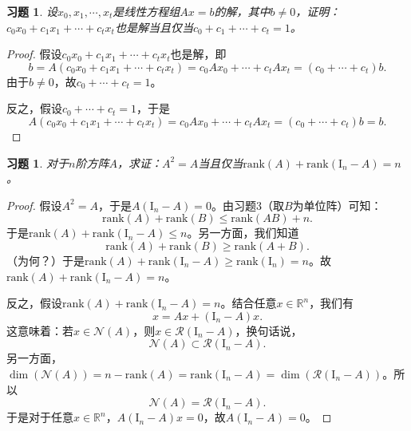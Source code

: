 \documentclass[UTF8]{ctexart}
\newtheorem{ex}[thm]{习题}
\begin{document}
\begin{ex}
	设$x_0, x_1, \cdots, x_t$是线性方程组$Ax =b$的解，其中$b \neq 0$，证明：$c_0 x_0 + c_1x_1 + \cdots + c_t x_t$也是解当且仅当$c_0 + c_1 + \cdots + c_t = 1$。
\end{ex}
\begin{proof}
	假设$c_0 x_0 + c_1x_1 + \cdots + c_t x_t$也是解，即
	\begin{equation}
		b = A(c_0 x_0 + c_1x_1 + \cdots + c_t x_t) = c_0 Ax_0+ \cdots + c_t Ax_t = (c_0+ \cdots + c_t)b.
	\end{equation}
	由于$b \neq 0$，故$c_0+ \cdots + c_t = 1$。
	\
	
	反之，假设$c_0+ \cdots + c_t = 1$，于是
	\begin{equation}
		A(c_0 x_0 + c_1x_1 + \cdots + c_t x_t) = c_0 Ax_0+ \cdots + c_t Ax_t = (c_0+ \cdots + c_t)b = b.
	\end{equation}
\end{proof}
\begin{ex}
	对于$n$阶方阵$A$，求证：$A^2 = A$当且仅当$\mathrm{rank}(A) + \mathrm{rank}(\mathrm{I}_n - A) = n $。
\end{ex}
\begin{proof}
	假设$A^2 = A$，于是$A(\mathrm{I}_n - A) =0$。由习题3（取$B$为单位阵）可知：
	\[
	\mathrm{rank}(A) + \mathrm{rank}(B) \leq \mathrm{rank}(AB) + n.  
	\]
	于是$\mathrm{rank}(A) + \mathrm{rank}(\mathrm{I}_n - A) \leq n$。另一方面，我们知道
	\begin{equation} \label{3}
		\mathrm{rank}(A) + \mathrm{rank}(B) \geq \mathrm{rank}(A+B).
	\end{equation}
	（为何？）于是$\mathrm{rank}(A) + \mathrm{rank}(\mathrm{I}_n - A)  \geq \mathrm{rank}(\mathrm{I}_n ) = n$。故$\mathrm{rank}(A) + \mathrm{rank}(\mathrm{I}_n - A) = n $。
	\
	
	反之，假设$\mathrm{rank}(A) + \mathrm{rank}(\mathrm{I}_n - A) = n $。结合任意$x \in \mathbb{R}^n$，我们有
	\[
	x = Ax + (\mathrm{I}_n - A)x.
	\]
	这意味着：若$x \in \mathcal{N}(A)$，则$x \in \mathcal{R}(\mathrm{I}_n - A)$，换句话说，
	\[
	\mathcal{N}(A) \subset \mathcal{R}(\mathrm{I}_n - A).
	\]
	另一方面，$\dim(\mathcal{N}(A)) = n - \mathrm{rank}(A) = \mathrm{rank}(\mathrm{I}_n - A)  = \dim(\mathcal{R}(\mathrm{I}_n - A))$。所以
	\[
	\mathcal{N}(A) = \mathcal{R}(\mathrm{I}_n - A).
	\]
	于是对于任意$x \in \mathbb{R}^n$，$A(\mathrm{I}_n - A) x =0$，故$A(\mathrm{I}_n - A) =0$。
\end{proof}
\end{document}
